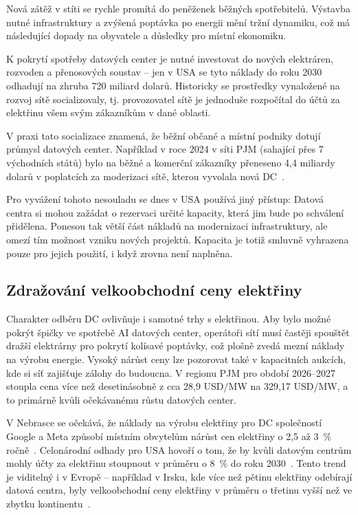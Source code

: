 Nová zátěž v stíti se rychle promítá do peněženek běžných spotřebitelů. Výstavba nutné infrastruktury a zvýšená poptávka po energii mění tržní dynamiku, což má následující dopady na obyvatele a důsledky pro místní ekonomiku.

K pokrytí spotřeby datových center je nutné investovat do nových elektráren, rozvoden a přenosových soustav -- jen v USA se tyto náklady do roku 2030 odhadují na zhruba 720 miliard dolarů. Historicky se prostředky vynaložené na rozvoj sítě socializovaly, tj. provozovatel sítě je jednoduše rozpočítal do účtů za elektřinu všem svým zákazníkům v dané oblasti.~\cite[s.~18--19]{ginzburg-ganz_technical_2025}

V praxi tato socializace znamená, že běžní občané a místní podniky dotují průmysl datových center. Například v roce 2024 v síti PJM (sahající přes 7 východních států) bylo na běžné a komerční zákazníky přeneseno 4,4 miliardy dolarů v poplatcích za moderizaci sítě, kterou vyvolala nová DC~\cite[s.~19]{ginzburg-ganz_technical_2025}.

Pro vyvážení tohoto nesouladu se dnes v USA používá jiný přístup: Datová centra si mohou zažádat o rezervaci určité kapacity, která jim bude po schválení přidělena. Ponesou tak větší část nákladů na modernizaci infrastruktury, ale omezí tím možnost vzniku nových projektů. Kapacita je totiž smluvně vyhrazena pouze pro jejich použití, i když zrovna není naplněna.~\cite[s.~106--107]{international_energy_agency_iea_energy_2025}

\subsection{Zdražování velkoobchodní ceny elektřiny}
\label{subsec:energie_zdrazovani}

Charakter odběru DC ovlivňuje i samotné trhy s elektřinou. Aby bylo možné pokrýt špičky ve spotřebě AI datových center, operátoři sítí musí častěji spouštět dražší elektrárny pro pokrytí kolísavé poptávky, což plošně zvedá mezní náklady na výrobu energie. Vysoký nárůst ceny lze pozorovat také v kapacitních aukcích, kde si síť zajišťuje zálohy do budoucna. V regionu PJM pro období 2026--2027 stoupla cena více než desetinásobně z cca 28,9 USD/MW na 329,17 USD/MW, a to primárně kvůli očekávanému růstu datových center.~\cite[s.~9]{chen_electricity_2025}

V Nebrasce se očekává, že náklady na výrobu elektřiny pro DC společností Google a Meta způsobí místním obvytelům nárůst cen elektřiny o 2,5 až 3~\% ročně~\cite[s.~23]{de_roucy-rochegonde_ai_2025}. Celonárodní odhady pro USA hovoří o tom, že by kvůli datovým centrům mohly účty za elektřinu stoupnout v průměru o 8~\% do roku 2030~\cite[s.~19]{ginzburg-ganz_technical_2025}. Tento trend je viditelný i v Evropě -- například v Irsku, kde více než pětinu elektřiny odebírají datová centra, byly velkoobchodní ceny elektřiny v průměru o třetinu vyšší než ve zbytku kontinentu~\cite[s.~23]{de_roucy-rochegonde_ai_2025}.

